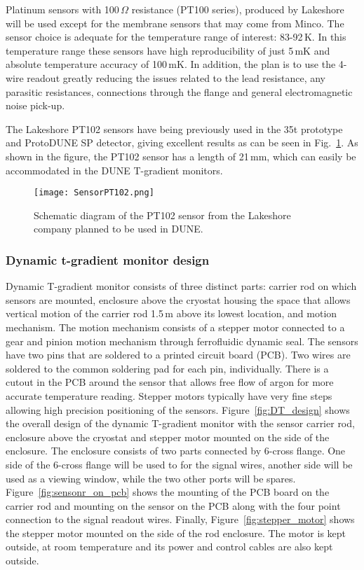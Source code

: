 Platinum sensors with 100\,$\Omega$ resistance (PT100 series), produced by Lakeshore will be used except for the membrane sensors that may come from Minco. The sensor choice is adequate for the temperature range of interest: 83-92\,K. In this temperature range these sensors have high reproducibility of just 5\,mK and absolute temperature accuracy of 100\,mK. In addition, the plan is to use the 4-wire readout greatly reducing the issues related to the lead resistance, any parasitic resistances, connections through the flange and general electromagnetic noise pick-up.

The Lakeshore PT102 sensors have being previously used in the 35t prototype and ProtoDUNE SP detector, giving excellent results as can be seen in Fig.~\ref{fig:sensor_pt102}.  As shown in the figure, the PT102 sensor has a length of 21\,mm, which can easily be accommodated in the DUNE T-gradient monitors. 

\begin{figure}[htb]
\centering
  \texttt{[image: SensorPT102.png]}
  \caption{Schematic diagram of the PT102 sensor from the Lakeshore company planned to be used in DUNE.}
  \label{fig:sensor_pt102}
\end{figure}

\subsubsection{Dynamic t-gradient monitor design}
Dynamic T-gradient monitor consists of three distinct parts: carrier rod on which sensors are mounted, enclosure above the cryostat housing the space that allows vertical motion of the carrier rod 1.5\,m above its lowest location, and motion mechanism. The motion mechanism consists of a stepper motor connected to a gear and pinion motion mechanism through ferrofluidic dynamic seal. The sensors have two pins that are soldered to a printed circuit board (PCB). Two wires are soldered to the common soldering pad for each pin, individually.   There is a cutout in the PCB around the sensor that allows free flow of argon for more accurate temperature reading.  Stepper motors typically have very fine steps allowing high precision positioning of the sensors.  Figure~\ref{fig:DT_design} shows the overall design of the dynamic T-gradient monitor with the sensor carrier rod, enclosure above the cryostat and stepper motor mounted on the side of the enclosure. The enclosure consists of two parts connected by 6-cross flange. One side of the 6-cross flange will be used to for the signal wires, another side will be used as a viewing window, while the two other ports will be spares. Figure~\ref{fig:sensonr_on_pcb} shows the mounting of the PCB board on the carrier rod and mounting on the sensor on the PCB along with the four point connection to the signal readout wires. Finally, Figure~\ref{fig:stepper_motor} shows the stepper motor mounted on the side of the rod enclosure. The motor is kept outside, at room temperature and its power and control cables are also kept outside.


